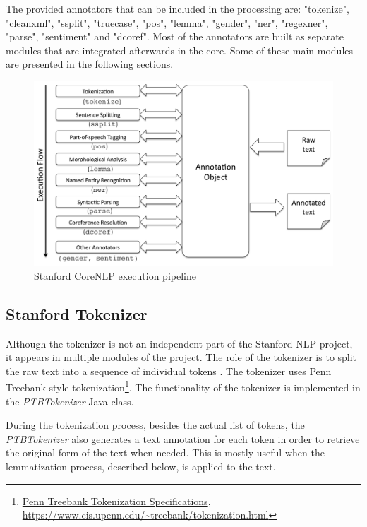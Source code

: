 The provided annotators that can be included in the processing are: "tokenize", "cleanxml", "ssplit", "truecase", "pos", "lemma", "gender", "ner", "regexner", "parse", "sentiment" and "dcoref". Most of the annotators are built as separate modules that are integrated afterwards in the core. Some of these main modules are presented in the following sections.

\begin{figure}[htb]
  \centering
  \includegraphics[width=\textwidth]{src/img/corenlp-pipeline.png}
  \caption[Stanford CoreNLP execution pipeline]{Stanford CoreNLP execution pipeline \cite{Manning2014}}
  \label{fig:corenlp-pipeline}
\end{figure}

\subsection{Stanford Tokenizer}
\label{sub-sec:stanford-tokenizer}

Although the tokenizer is not an independent part of the Stanford NLP project, it appears in multiple modules of the project. The role of the tokenizer is to split the raw text into a sequence of individual tokens \cite{Manning2014}. The tokenizer uses Penn Treebank style tokenization\footnote{\href{https://www.cis.upenn.edu/~treebank/tokenization.html}{Penn Treebank Tokenization Specifications}, \url{https://www.cis.upenn.edu/~treebank/tokenization.html}}. The functionality of the tokenizer is implemented in the {\em PTBTokenizer} Java class.

During the tokenization process, besides the actual list of tokens, the {\em PTBTokenizer} also generates a text annotation for each token in order to retrieve the original form of the text when needed. This is mostly useful when the lemmatization process, described below, is applied to the text.

